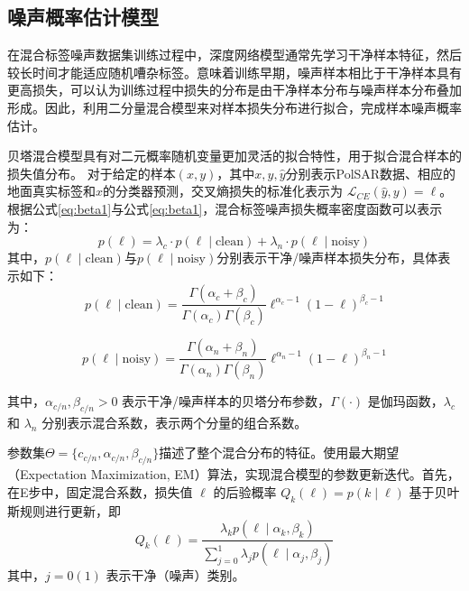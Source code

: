 \subsection{噪声概率估计模型}
在混合标签噪声数据集训练过程中，深度网络模型通常先学习干净样本特征，然后较长时间才能适应随机嘈杂标签。意味着训练早期，噪声样本相比于干净样本具有更高损失，可以认为训练过程中损失的分布是由干净样本分布与噪声样本分布叠加形成。因此，利用二分量混合模型来对样本损失分布进行拟合，完成样本噪声概率估计。

贝塔混合模型具有对二元概率随机变量更加灵活的拟合特性，用于拟合混合样本的损失值分布。
对于给定的样本$(x, y)$，其中$x, y, \hat{y}$分别表示PolSAR数据、相应的地面真实标签和$x$的分类器预测，交叉熵损失的标准化表示为 $\mathcal{L}_{CE}(\hat{y}, y) = \ell$。根据公式\eqref{eq:beta1}与公式\eqref{eq:beta1}，混合标签噪声损失概率密度函数可以表示为：
\begin{equation}
    p(\ell)=\lambda_c \cdot p(\ell \mid \text{clean})+\lambda_n \cdot p(\ell \mid \text{noisy})
\end{equation}
其中，$p(\ell \mid \text{clean})$与$p(\ell \mid \text{noisy})$分别表示干净/噪声样本损失分布，具体表示如下：
\begin{equation}
    p(\ell \mid \text{clean})=\frac{\Gamma(\alpha_c+\beta_c)}{\Gamma(\alpha_c) \Gamma(\beta_c)} \ell^{\alpha_c-1}(1-\ell)^{\beta_c-1}
\end{equation}

\begin{equation}
    p(\ell \mid \text{noisy})=\frac{\Gamma(\alpha_n+\beta_n)}{\Gamma(\alpha_n) \Gamma(\beta_n)} \ell^{\alpha_n-1}(1-\ell)^{\beta_n-1}
\end{equation}

其中，$\alpha_{c/n}, \beta_{c/n} > 0$ 表示干净/噪声样本的贝塔分布参数，$\Gamma(\cdot)$ 是伽玛函数，$\lambda_{c}$ 和 $\lambda_{n}$ 分别表示混合系数，表示两个分量的组合系数。

参数集$\Theta = \{c_{c/n}, \alpha_{c/n}, \beta_{c/n}\}$描述了整个混合分布的特征。使用最大期望（Expectation Maximization, EM）算法，实现混合模型的参数更新迭代。首先，在E步中，固定混合系数，损失值 \(\ell\) 的后验概率 \(Q_k(\ell)=p(k \mid \ell)\) 基于贝叶斯规则进行更新，即
\begin{equation}
    Q_k(\ell)=\frac{\lambda_k p(\ell \mid \alpha_k, \beta_k)}{\sum_{j=0}^{1}\lambda_j p(\ell \mid \alpha_j, \beta_j)}
    \label{eq:BMM_PDF}
\end{equation}
其中，$j=0(1)$ 表示干净（噪声）类别。

